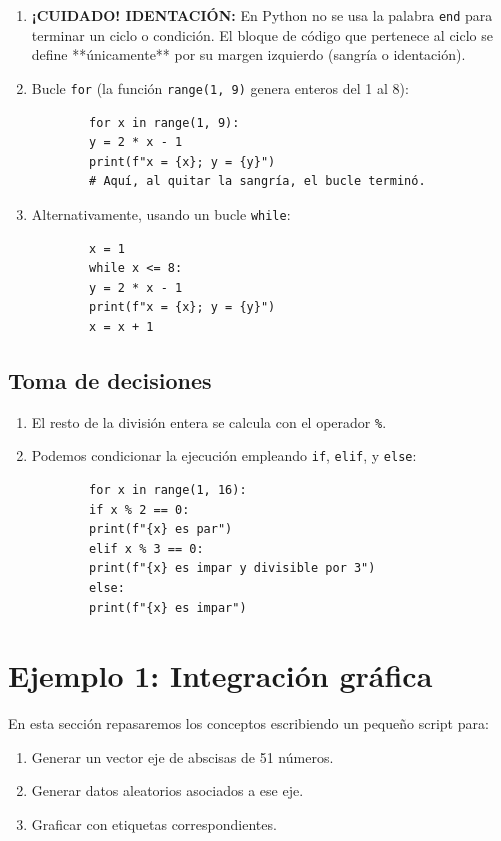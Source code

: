 \begin{enumerate}
	\item \textbf{¡CUIDADO! IDENTACIÓN:} En Python no se usa la palabra \texttt{end} para terminar un ciclo o condición. El bloque de código que pertenece al ciclo se define **únicamente** por su margen izquierdo (sangría o identación).
	
	\item Bucle \texttt{for} (la función \texttt{range(1, 9)} genera enteros del 1 al 8):
	\begin{verbatim}
		for x in range(1, 9):
		y = 2 * x - 1
		print(f"x = {x}; y = {y}")
		# Aquí, al quitar la sangría, el bucle terminó.
	\end{verbatim}
	
	\item Alternativamente, usando un bucle \texttt{while}:
	\begin{verbatim}
		x = 1
		while x <= 8:
		y = 2 * x - 1
		print(f"x = {x}; y = {y}")
		x = x + 1 
	\end{verbatim}
\end{enumerate}

\subsection{Toma de decisiones}

\begin{enumerate}
	\item El resto de la división entera se calcula con el operador \texttt{\%}.
	\item Podemos condicionar la ejecución empleando \texttt{if}, \texttt{elif}, y \texttt{else}:
	\begin{verbatim}
		for x in range(1, 16):
		if x % 2 == 0:
		print(f"{x} es par")
		elif x % 3 == 0:
		print(f"{x} es impar y divisible por 3")
		else:
		print(f"{x} es impar")
	\end{verbatim}
\end{enumerate}

\section{Ejemplo 1: Integración gráfica}

En esta sección repasaremos los conceptos escribiendo un pequeño script para:
\begin{enumerate}
	\item Generar un vector eje de abscisas de 51 números.
	\item Generar datos aleatorios asociados a ese eje.
	\item Graficar con etiquetas correspondientes.
\end{enumerate}

